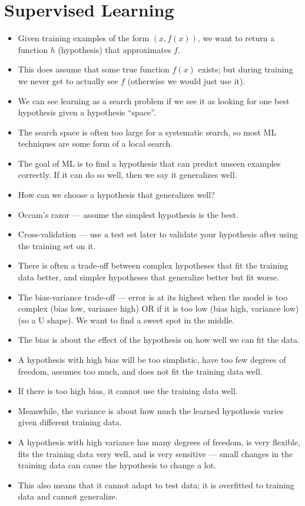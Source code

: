 \documentclass{article}
\begin{document}
\section{Supervised Learning}
\begin{itemize}
    \item Given training examples of the form $(x, f(x))$, we want to return a function $h$ (hypothesis) that approximates $f$.
    \item This does assume that some true function $f(x)$ exists; but during training we never get to actually see $f$ (otherwise we would just use it).
    \item We can see learning as a search problem if we see it as looking for one best hypothesis given a hypothesis ``space''.
    \item The search space is often too large for a systematic search, so most ML techniques are some form of a local search.
    \item The goal of ML is to find a hypothesis that can predict unseen examples correctly.  If it can do so well, then we say it generalizes well.
    \item How can we choose a hypothesis that generalizes well?
    \item Occam's razor --- assume the simplest hypothesis is the best.
    \item Cross-validation --- use a test set later to validate your hypothesis after using the training set on it.
    \item There is often a trade-off between complex hypotheses that fit the training data better, and simpler hypotheses that generalize better but fit worse.
    \item The bias-variance trade-off --- error is at its highest when the model is too complex (bias low, variance high) OR if it is too low (bias high, variance low) (so a U shape).  We want to find a sweet spot in the middle.
    \item The bias is about the effect of the hypothesis on how well we can fit the data.
    \item A hypothesis with high bias will be too simplistic, have too few degrees of freedom, assumes too much, and does not fit the training data well.
    \item If there is too high bias, it cannot use the training data well.
    \item Meanwhile, the variance is about how much the learned hypothesis varies given different training data.
    \item A hypothesis with high variance has many degrees of freedom, is very flexible, fits the training data very well, and is very sensitive --- small changes in the training data can cause the hypothesis to change a lot.
    \item This also means that it cannot adapt to test data; it is overfitted to training data and cannot generalize.
\end{itemize}
\end{document}
